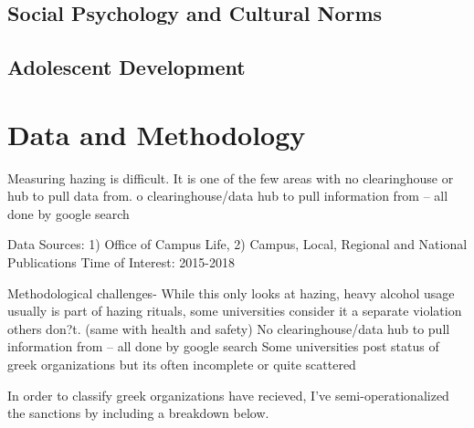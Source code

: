 \documentclass[12pt]{amsart}
\begin{document}
\subsection{Social Psychology and Cultural Norms}



\subsection{Adolescent Development}





\section{Data and Methodology}

Measuring hazing is difficult. It is one of the few areas with no clearinghouse or hub to pull data from.  o clearinghouse/data hub to pull information from -- all done by google search

Data Sources: 1) Office of Campus Life, 2) Campus, Local, Regional and National Publications
Time of Interest: 2015-2018

Methodological challenges- While this only looks at hazing, heavy alcohol usage usually is part of hazing rituals, some universities consider it a separate violation others don?t. (same with health and safety) 
No clearinghouse/data hub to pull information from -- all done by google search
Some universities post status of greek organizations but its often incomplete or quite scattered

In order to classify greek organizations have recieved, I've semi-operationalized the sanctions by including a breakdown below. 
\end{document}
